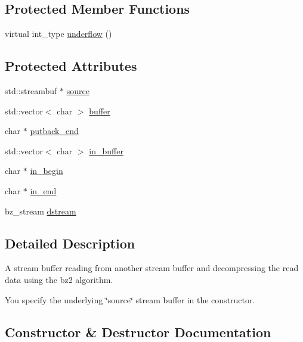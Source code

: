 \subsection*{Protected Member Functions}
\begin{DoxyCompactItemize}
\item 
virtual int\+\_\+type \hyperlink{classbz2inbuf_aedaed3dfd541bd5640a8e01e1a04133c}{underflow} ()
\end{DoxyCompactItemize}
\subsection*{Protected Attributes}
\begin{DoxyCompactItemize}
\item 
std\+::streambuf $\ast$ \hyperlink{classbz2inbuf_aa138660fd1e7505a1af60ce10064ef93}{source}
\item 
std\+::vector$<$ char $>$ \hyperlink{classbz2inbuf_a7db0b1bb3054df792c269754306fb546}{buffer}
\item 
char $\ast$ \hyperlink{classbz2inbuf_ab0063541f3949fe910f1a993789aab6d}{putback\+\_\+end}
\item 
std\+::vector$<$ char $>$ \hyperlink{classbz2inbuf_aca2703126457f14f5d9e07198b4b2caa}{in\+\_\+buffer}
\item 
char $\ast$ \hyperlink{classbz2inbuf_a6118e6828621c807c9f9fdf84120c696}{in\+\_\+begin}
\item 
char $\ast$ \hyperlink{classbz2inbuf_a2b7be2413ec7bac374d5ac601798494c}{in\+\_\+end}
\item 
bz\+\_\+stream \hyperlink{classbz2inbuf_acbd6605608f6ab76cde393f56cc354cc}{dstream}
\end{DoxyCompactItemize}


\subsection{Detailed Description}
A stream buffer reading from another stream buffer and decompressing the read data using the bz2 algorithm. 

You specify the underlying \char`\"{}source\char`\"{} stream buffer in the constructor. 

\subsection{Constructor \& Destructor Documentation}
\hypertarget{classbz2inbuf_a25f60f9742732d40bff5d5c01f93b8c3}{}
